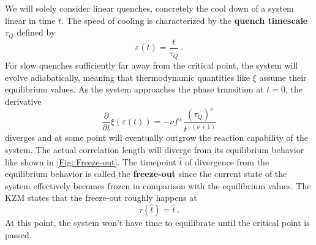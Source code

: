 	We will solely consider linear quenches, concretely the cool down of a system linear in time $t$. The speed of cooling is characterized by the \textbf{quench timescale} $\tau_Q$ defined by
	\begin{equation} \label{Eq::Linear-Quench}
		\varepsilon(t) =	\frac{t}{\tau_Q}~.
	\end{equation}
	For slow quenches sufficiently far away from the critical point, the system will evolve adiabatically, meaning that thermodynamic quantities like $\xi$ assume their equilibrium values. As the system approaches the phase transition at $t=0$, the derivative
	\begin{equation}
		\frac{\partial}{\partial t} \xi(\varepsilon(t)) =	- \nu f^{\pm} \frac{(\tau_Q)^\nu}{t^{-(\nu + 1)}}
	\end{equation}
	diverges and at some point will eventually outgrow the reaction capability of the system. The actual correlation length will diverge from its equilibrium behavior like shown in \autoref{Fig::Freeze-out}. The timepoint $\hat{t}$ of divergence from the equilibrium behavior is called the \textbf{freeze-out} since the current state of the system effectively becomes frozen in comparison with the equilibrium values. The KZM states that the freeze-out roughly happens at
	\begin{equation}
		\tau(\hat{t}) = \hat{t}~.
	\end{equation}
	At this point, the system won't have time to equilibrate until the critical point is passed.
